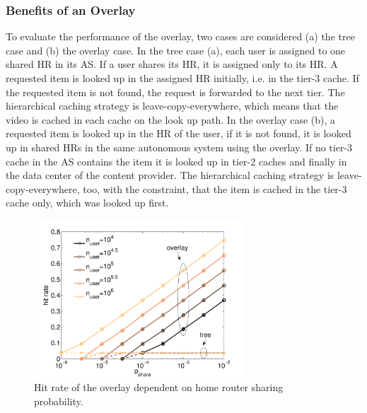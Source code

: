 \subsubsection{Benefits of an Overlay}

To evaluate the performance of the overlay, two cases are considered (a) the tree case and (b) the overlay case. In the tree case (a), each user is assigned to one shared HR in its AS. If a user shares its HR, it is assigned only to its HR. A requested item is looked up in the assigned HR initially, i.e. in the tier-3 cache. If the requested item is not found, the request is forwarded to the next tier. The hierarchical caching strategy is leave-copy-everywhere, which means that the video is cached in each cache on the look up path. In the overlay case (b), a requested item is looked up in the HR of the user, if it is not found, it is looked up in shared HRs in the same autonomous system using the overlay. If no tier-3 cache in the AS contains the item it is looked up in tier-2 caches and finally in the data center of the content provider. The hierarchical caching strategy is leave-copy-everywhere, too, with the constraint, that the item is cached in the tier-3 cache only, which was looked up first.

\begin{figure}[tb]
  \centering
  \includegraphics[width=0.7\textwidth]{hierarchical/simulative/figures/overlay_nuser_hitrate3}
  \caption{Hit rate of the overlay dependent on home router sharing probability.}
  \label{fig:overlay_nuser_hitrate}
\end{figure}


